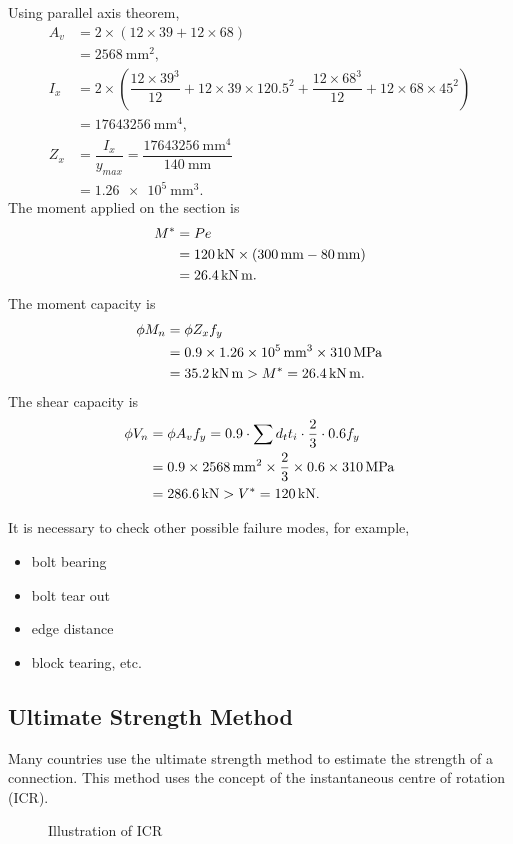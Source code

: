 \begin{solution}
\begin{figure}[H]

\end{figure}
Using parallel axis theorem,
\begin{align*}
A_v&=2\times\left(12\times39+12\times68\right)\\
&=\SI{2568}{\mm^2},\\
I_x&=2\times\left(\dfrac{12\times39^3}{12}+12\times39\times120.5^2+\dfrac{12\times68^3}{12}+12\times68\times45^2\right)\\
&=\SI{17643256}{\mm^4},\\
Z_x&=\dfrac{I_x}{y_{max}}=\dfrac{\SI{17643256}{\mm^4}}{\SI{140}{\mm}}\\&=\SI{1.26e5}{\mm^3}.
\end{align*}
The moment applied on the section is
\begin{align*}
M^*&=Pe\\&=\SI{120}{\kilo\newton}\times\left(\SI{300}{\milli\meter}-\SI{80}{\milli\meter}\right)\\&=\SI{26.4}{\kilo\newton\meter}.
\end{align*}
The moment capacity is
\begin{align*}
\phi{}M_n&=\phi{}Z_xf_y\\&=0.9\times\SI{1.26e5}{\milli\meter^3}\times\SI{310}{\mega\pascal}\\&=\SI{35.2}{\kilo\newton\meter}>M^*=\SI{26.4}{\kilo\newton\meter}.
\end{align*}
The shear capacity is
\begin{align*}
\phi{}V_n&=\phi{}A_vf_y=0.9\cdot\sum{}d_tt_i\cdot\dfrac{2}{3}\cdot0.6f_y\\
&=0.9\times\SI{2568}{\milli\meter^2}\times\dfrac{2}{3}\times0.6\times\SI{310}{\mega\pascal}\\
&=\SI{286.6}{\kilo\newton}>V^*=\SI{120}{\kilo\newton}.
\end{align*}

It is necessary to check other possible failure modes, for example,
\begin{itemize}
\item bolt bearing
\item bolt tear out
\item edge distance
\item block tearing, etc.
\end{itemize}
\end{solution}
\subsection{Ultimate Strength Method}
Many countries use the ultimate strength method to estimate the strength of a connection. This method uses the concept of the instantaneous centre of rotation (ICR).
\begin{figure}[H]
\centering\caption{Illustration of ICR}
\end{figure}

